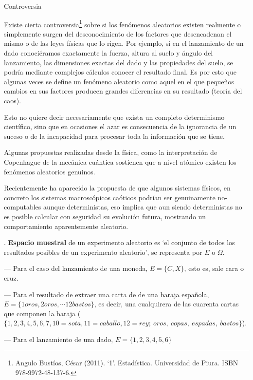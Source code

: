 \begin{myexampleblock}{Controversia}
\begin{small}
Existe cierta controversia\footnote{Angulo Bustíos, César (2011). `1'. Estadística. Universidad de Piura. ISBN 978-9972-48-137-6.} sobre si los fenómenos aleatorios existen realmente o simplemente surgen del desconocimiento de los factores que desencadenan el mismo o de las leyes físicas que lo rigen. Por ejemplo, si en el lanzamiento de un dado conociéramos exactamente la fuerza, altura al suelo y ángulo del lanzamiento, las dimensiones exactas del dado y las propiedades del suelo, se podría mediante complejos cálculos conocer el resultado final. Es por esto que algunas veces se define un fenómeno aleatorio como aquel en el que pequeños cambios en sus factores producen grandes diferencias en su resultado (teoría del caos).

\vspace{2mm} Esto no quiere decir necesariamente que exista un completo determinismo científico, sino que en ocasiones el azar es consecuencia de la ignorancia de un suceso o de la incapacidad para procesar toda la información que se tiene.

\vspace{2mm} Algunas propuestas realizadas desde la física, como la interpretación de Copenhague de la mecánica cuántica sostienen que a nivel atómico existen los fenómenos aleatorios genuinos.

\vspace{2mm} Recientemente ha aparecido la propuesta de que algunos sistemas físicos, en concreto los sistemas macroscópicos caóticos podrían ser genuinamente no-computables aunque deterministas, eso implica que aun siendo deterministas no es posible calcular con seguridad su evolución futura, mostrando un comportamiento aparentemente aleatorio.\end{small}
\end{myexampleblock}

\begin{definition}
.	\textbf{Espacio muestral} de un experimento aleatorio es `el conjunto de todos los resultados posibles de un experimento aleatorio', se representa por $E$ o $\Omega$.

--- Para el caso del lanzamiento de una moneda, $E=\{C,X\}$, esto es, sale cara o cruz. 

--- Para el resultado de extraer una carta de de una baraja española, $E=\{1oros, 2oros, \cdots 12bastos\}$, es decir, una cualquirera de las cuarenta cartas que componen la baraja \textcolor{gris}{($\{1,2,3,4,5,6,7,10=sota, 11=caballo, 12=rey ;\ oros, \ copas,\ espadas,\ bastos\}$)}.	

--- Para el lanzamiento de una dado, $E=\{1,2,3,4,5,6\}$
\end{definition}


